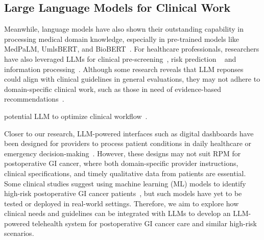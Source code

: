 \subsection{Large Language Models for Clinical Work}
Meanwhile, language models have also shown their outstanding capability in processing medical domain knowledge, especially in pre-trained models like MedPaLM\cite{singhalLargeLanguageModels2023}, UmlsBERT\cite{michalopoulosUmlsBERTClinicalDomain2021}, and BioBERT~\cite{leeBioBERTPretrainedBiomedical2019}. For healthcare professionals, researchers have also leveraged LLMs for clinical pre-screening~\cite{hamer_improving_2023, wang_brilliant_2021}, risk prediction ~\cite{o2015risk,gatt2022review, kennedy2014delirium, beede2020human} and information processing~\cite{kocaballi_envisioning_2020, nair_generating_2023,  cascella2023evaluating, nori2023capabilities, agrawal_large_2022, arbatti_what_2023}. 
Although some research reveals that LLM reponses could align with clinical guidelines in general evaluations, they may not adhere to domain-specific clinical work, such as those in need of evidence-based recommendations~\cite{nwachukwu2024currently}.

potential LLM to optimize clinical workflow~\cite{tripathi2024efficient}.

Closer to our research, LLM-powered interfaces such as digital dashboards have been designed for providers to process patient conditions in daily healthcare or emergency decision-making~\cite{yangWishThereWere2024, zhangRethinkingHumanAICollaboration2024}. However, these designs may not suit RPM for postoperative GI cancer, where both domain-specific provider instructions, clinical specifications, and timely qualitative data from patients are essential. Some clinical studies suggest using machine learning (ML) models to identify high-risk postoperative GI cancer patients~\cite{vankootenPreoperativeRiskFactors2021, chenDevelopmentValidationMachine2022a}, but such models have yet to be tested or deployed in real-world settings. Therefore, we aim to explore how clinical needs and guidelines can be integrated with LLMs to develop an LLM-powered telehealth system for postoperative GI cancer care and similar high-risk scenarios.